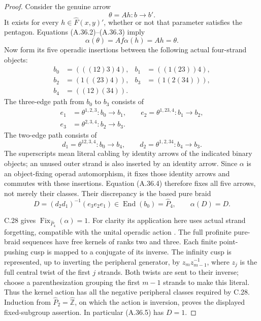 \begin{proof}
Consider the genuine arrow
\[
                     \theta=A h:b\longrightarrow b'.
\]
It exists for every \(h\in\widehat F(x,y)'\), whether
or not that parameter satisfies the pentagon. Equations
(A.36.2)--(A.36.3) imply
\[
             \alpha(\theta)=A f\alpha(h)=A h=\theta.
 \tag{A.36.4}
\]
Now form its five operadic insertions between the
following actual four-strand objects:
\[
 \begin{aligned}
 b_0&=(((12)3)4),& b_1&=((1(23))4),\\
 b_2&=(1((23)4)),& b_3&=(1(2(34))),\\
 b_4&=((12)(34)).
 \end{aligned}
\]
The three-edge path from \(b_0\) to \(b_3\) consists of
\[
 \begin{aligned}
 e_1&=\theta^{1,2,3}:b_0\to b_1,\qquad
 e_2=\theta^{1,23,4}:b_1\to b_2,\\
 e_3&=\theta^{2,3,4}:b_2\to b_3.
 \end{aligned}
\]
The two-edge path consists of
\[
 d_1=\theta^{12,3,4}:b_0\to b_4,\qquad
 d_2=\theta^{1,2,34}:b_4\to b_3.
\]
The superscripts mean literal cabling by identity arrows
of the indicated binary objects; an unused outer
strand is also inserted by an identity arrow. Since
\(\alpha\) is an object-fixing operad automorphism,
it fixes those identity arrows and commutes with these
insertions. Equation (A.36.4) therefore fixes all five
arrows, not merely their classes. Their discrepancy is
the based pure braid
\[
                D=(d_2d_1)^{-1}(e_3e_2e_1)
                   \in\operatorname{End}(b_0)=\widehat P_4,
 \qquad \alpha(D)=D.
 \tag{A.36.5}
\]

C.28 gives \(\operatorname{Fix}_{\widehat P_4}(\alpha)=1\).
For clarity its application here uses actual strand
forgetting, compatible with the unital operadic action
\cite[Proposition 11.5 and Corollary 11.6]{CEBHR2019}.
The full profinite pure-braid sequences have free
kernels of ranks two and three. Each finite
point-pushing cusp is mapped to a conjugate of its
inverse. The infinity cusp is represented, up to
inverting the peripheral generator, by
\(z_m z_{m-1}^{-1}\), where \(z_j\) is the full
central twist of the first \(j\) strands. Both twists
are sent to their inverse; choose a parenthesization
grouping the first \(m-1\) strands to make this
literal. Thus the kernel action has all the negative
peripheral classes required by C.28. Induction from
\(\widehat P_2=\widehat{\mathbb Z}\), on which the
action is inversion, proves the displayed fixed-subgroup
assertion. In particular (A.36.5) has \(D=1\).


\end{proof}
